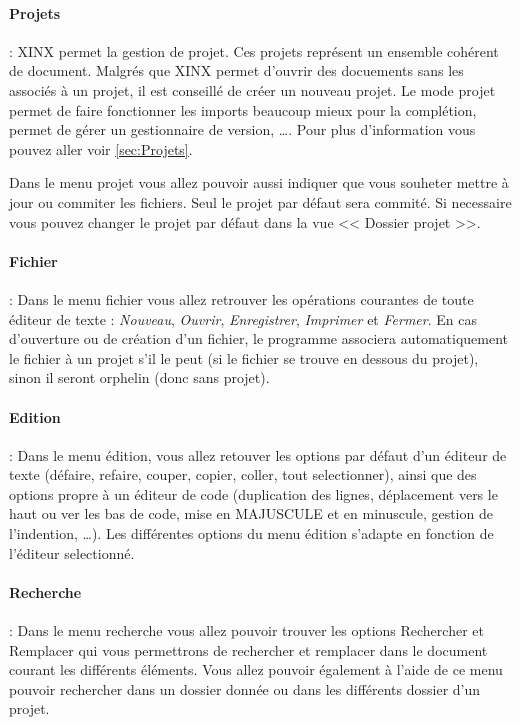 \documentclass[a4paper,10pt,twoside]{book}
\begin{document}
\paragraph{Projets} : XINX permet la gestion de projet. Ces projets représent un ensemble cohérent de document. Malgrés que XINX permet d'ouvrir des docuements sans les associés à un projet, il est conseillé de créer un nouveau projet. Le mode projet permet de faire fonctionner les imports beaucoup mieux pour la complétion, permet de gérer un gestionnaire de version, \dots. Pour plus d'information vous pouvez aller voir \ref{sec:Projets}. 

Dans le menu projet vous allez pouvoir aussi indiquer que vous souheter mettre à jour ou commiter les fichiers. Seul le projet par défaut sera commité. Si necessaire vous pouvez changer le projet par défaut dans la vue << Dossier projet >>.

\paragraph{Fichier} : Dans le menu fichier vous allez retrouver les opérations courantes de toute éditeur de texte : \emph{Nouveau}, \emph{Ouvrir}, \emph{Enregistrer}, \emph{Imprimer} et \emph{Fermer}. En cas d'ouverture ou de création d'un fichier, le programme associera automatiquement le fichier à un projet s'il le peut (si le fichier se trouve en dessous du projet), sinon il seront orphelin (donc sans projet).

\paragraph{Edition} : Dans le menu édition, vous allez retouver les options par défaut d'un éditeur de texte (défaire, refaire, couper, copier, coller, tout selectionner), ainsi que des options propre à un éditeur de code (duplication des lignes, déplacement vers le haut ou ver les bas de code, mise en MAJUSCULE et en minuscule, gestion de l'indention, \dots). Les différentes options du menu édition s'adapte en fonction de l'éditeur selectionné.

\paragraph{Recherche} : Dans le menu recherche vous allez pouvoir trouver les options Rechercher et Remplacer qui vous permettrons de rechercher et remplacer dans le document courant les différents éléments. Vous allez pouvoir également à l'aide de ce menu pouvoir rechercher dans un dossier donnée ou dans les différents dossier d'un projet.
\end{document}

